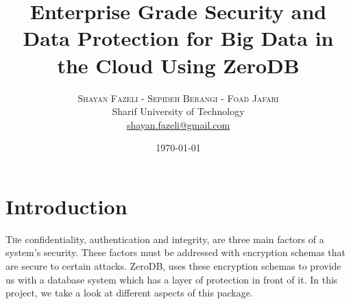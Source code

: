 \documentclass[twoside,twocolumn]{article}
\title{Enterprise Grade Security and Data Protection for Big Data in the Cloud Using ZeroDB} %
\author{%
\textsc{Shayan Fazeli - Sepideh Berangi - Foad Jafari} \\[1ex] %
\normalsize Sharif University of Technology \\ %
\normalsize \href{mailto:shayan.fazeli@gmail.com}{shayan.fazeli@gmail.com} %
}
\date{\today} %
\begin{document}
\maketitle


\section{Introduction}

\lettrine[nindent=0em,lines=3]{T} he confidentiality, authentication and integrity, are three main factors of a system's security. These factors must be addressed with encryption schemas that are secure to certain attacks. ZeroDB, uses these encryption schemas to provide us with a database system which has a layer of protection in front of it. In this project, we take a look at different aspects of this package.
\end{document}
